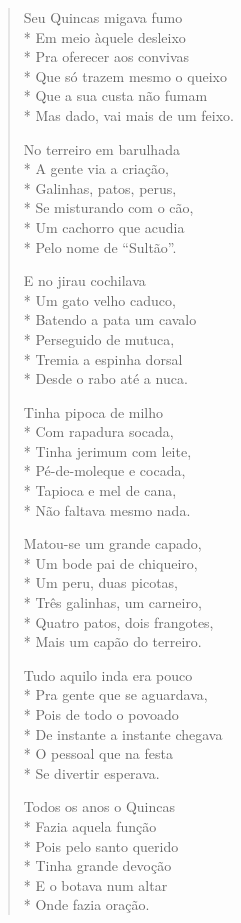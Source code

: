 \begin{verse}
Seu Quincas migava fumo\\*
Em meio àquele desleixo\\*
Pra oferecer aos convivas\\*
Que só trazem mesmo o queixo\\*
Que a sua custa não fumam\\*
Mas dado, vai mais de um feixo.

No terreiro em barulhada\\*
A gente via a criação,\\*
Galinhas, patos, perus,\\*
Se misturando com o cão,\\*
Um cachorro que acudia\\*
Pelo nome de “Sultão”.

E no jirau cochilava\\*
Um gato velho caduco,\\*
Batendo a pata um cavalo\\*
Perseguido de mutuca,\\*
Tremia a espinha dorsal\\*
Desde o rabo até a nuca.

Tinha pipoca de milho\\*
Com rapadura socada, \\*
Tinha jerimum com leite,\\*
Pé-de-moleque e cocada,\\*
Tapioca e mel de cana,\\*
Não faltava mesmo nada.

Matou-se um grande capado,\\*
Um bode pai de chiqueiro, \\*
Um peru, duas picotas,\\*
Três galinhas, um carneiro,\\*
Quatro patos, dois frangotes,\\*
Mais um capão do terreiro.

Tudo aquilo inda era pouco\\*
Pra gente que se aguardava,\\*
Pois de todo o povoado\\*
De instante a instante chegava\\*
O pessoal que na festa\\*
Se divertir esperava.

Todos os anos o Quincas\\*
Fazia aquela função\\*
Pois pelo santo querido\\*
Tinha grande devoção\\*
E o botava num altar\\*
Onde fazia oração.


\end{verse}
